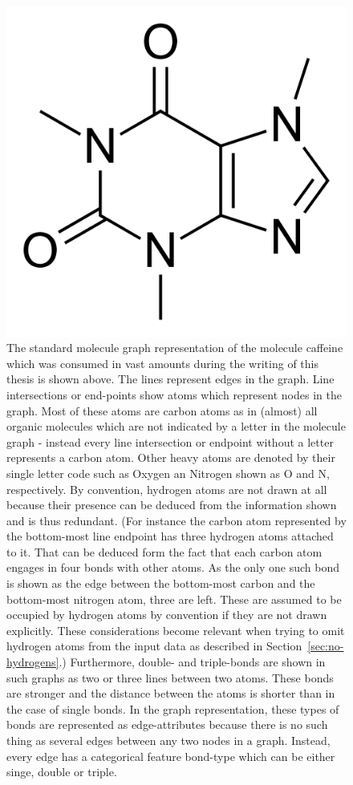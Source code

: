 \begin{figure}[H]
	\centering
	\includegraphics[width=0.7\linewidth]{figures/caffeine}
	\caption{The standard molecule graph representation of the molecule caffeine which was consumed in vast amounts during the writing of this thesis is shown above. The lines represent edges in the graph. Line intersections or end-points show atoms which represent nodes in the graph. Most of these atoms are carbon atoms as in (almost) all organic molecules which are not indicated by a letter in the molecule graph - instead every line intersection or endpoint without a letter represents a carbon atom. Other heavy atoms are denoted by their single letter code such as Oxygen an Nitrogen shown as O and N, respectively.
	By convention, hydrogen atoms are not drawn at all because their presence can be deduced from the information shown and is thus redundant. (For instance the carbon atom represented by the bottom-most line endpoint has three hydrogen atoms attached to it. That can be deduced form the fact that each carbon atom engages in four bonds with other atoms. As the only one such bond is shown as the edge between the bottom-most carbon and the bottom-most nitrogen atom, three are left. These are assumed to be occupied by hydrogen atoms by convention if they are not drawn explicitly. These considerations become relevant when trying to omit hydrogen atoms from the input data as described in Section~\ref{sec:no-hydrogens}.)
	Furthermore, double- and triple-bonds are shown in such graphs as two or three lines between two atoms. These bonds are stronger and the distance between the atoms is shorter than in the case of single bonds. In the graph representation, these types of bonds are represented as edge-attributes because there is no such thing as several edges between any two nodes in a graph. Instead, every edge has a categorical feature bond-type which can be either singe, double or triple.
	}
	\label{fig:caffeine}
\end{figure}


